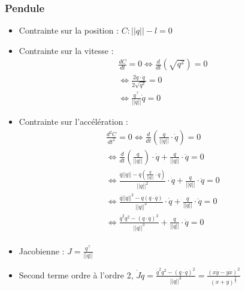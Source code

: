 \documentclass[11pt, letterpaper]{report}
\begin{document}
    \subsubsection{Pendule}\label{subsubsec:pendule}
    \begin{itemize}
        \item Contrainte sur la position : $C : ||q|| - l = 0$\\
        \item Contrainte sur la vitesse :
        \begin{gather*}
            \frac{dC}{dt} = 0 \Leftrightarrow \frac{d}{dt}(\sqrt{q^2}) = 0\\
            \Leftrightarrow \frac{2q \cdot \dot{q}}{2\sqrt{q^2}} = 0\\
            \Leftrightarrow \frac{q^\intercal}{||q||} \dot{q} = 0
        \end{gather*}
        \item Contrainte sur l'accélération :
        \begin{gather*}
            \frac{d^2C}{dt^2} = 0 \Leftrightarrow \frac{d}{dt}\left(\frac{q}{||q||} \cdot \dot{q}\right) = 0\\
            \Leftrightarrow \frac{d}{dt}\left(\frac{q}{||q||}\right) \cdot \dot{q} + \frac{q}{||q||} \cdot \ddot{q} = 0\\
            \Leftrightarrow
                \frac{\dot{q}||q|| - q \left(\frac{q}{||q||} \cdot \dot{q}\right)}{||q||^2} \cdot \dot{q}+ \frac{q}{||q||} \cdot \ddot{q} = 0\\
            \Leftrightarrow \frac{\dot{q}||q||^2 - q ( q \cdot \dot{q})} {||q||^3} \cdot \dot{q} + \frac{q}{||q||} \cdot \ddot{q} = 0\\
            \Leftrightarrow \frac{\dot{q}^2 q^2 - (q \cdot \dot{q})^2} {||q||^3} + \frac{q}{||q||} \cdot \ddot{q} = 0\\
        \end{gather*}
        \item Jacobienne : $J = \frac{q^\intercal}{||q||}$
        \item Second terme ordre à l'ordre 2,  $\dot{J}\dot{q} = \frac{\dot{q}^2 q^2 - (q \cdot \dot{q})^2} {||q||^3} = \frac{(x \dot{y} - y \dot{x})^2}{(x + y)^\frac{3}{2}}$
    \end{itemize}
\end{document}

